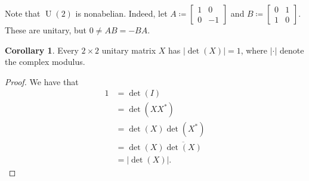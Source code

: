 \documentclass[10pt,letterpaper,cm]{nupset}
\theoremstyle{definition}
\theoremstyle{theorem}
\newtheorem{cor}[definition]{Corollary}
\theoremstyle{remark}
\newcommand{\1}{\mathbf{1}}
\newcommand{\0}{\vec {0}}
\DeclareMathOperator{\U}{U}
\begin{document}
\smallskip

Note that
$\U(2)$ is nonabelian. Indeed, 
let $A\coloneqq\begin{bmatrix} 1 & 0 \\  0 & -1\end{bmatrix}$ and $B\coloneqq\begin{bmatrix} 0 & 1 \\  1 & 0\end{bmatrix}$. These are unitary, but  $0\ne AB={-BA}$.


\begin{cor}\label{unitnorm}
Every $2\times 2$ unitary matrix $X$ has $\left\lvert{\det(X)}\right\rvert=1$, where $\left\lvert{\cdot}\right\rvert$ denote the complex modulus.   
\end{cor}

\begin{proof}
We have that 
\begin{align*}
1 &=\det(I)
\\ &=\det(XX^\ast)
\\ &= \det(X)\det(X^\ast)
\\ &=\det(X)\overline{\det(X)}
\\ &=\left\lvert{\det(X)}\right\rvert.
\end{align*}
\end{proof}

\medskip
\end{document}
